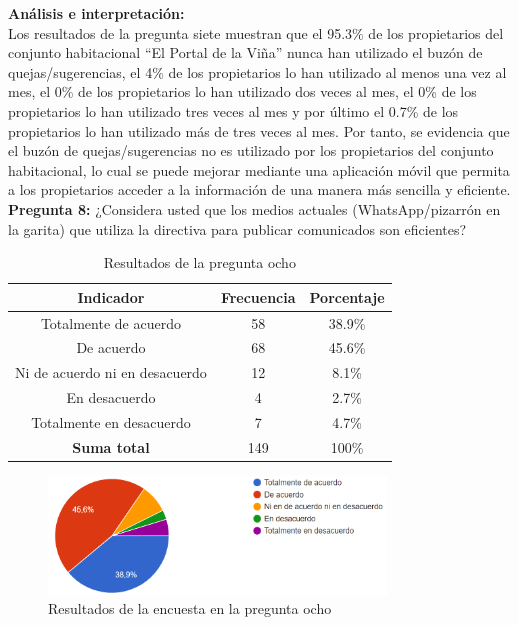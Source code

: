\textbf{Análisis e interpretación:}\\
Los resultados de la pregunta siete muestran que el 95.3\% de los propietarios del conjunto habitacional {\textquotedblleft}El Portal de la Viña{\textquotedblright} nunca han utilizado el buzón de quejas/sugerencias, el 4\% de los propietarios lo han utilizado al menos una vez al mes, el 0\% de los propietarios lo han utilizado dos veces al mes, el 0\% de los propietarios lo han utilizado tres veces al mes y por último el 0.7\% de los propietarios lo han utilizado más de tres veces al mes.
Por tanto, se evidencia que el buzón de quejas/sugerencias no es utilizado por los propietarios del conjunto habitacional, lo cual se puede mejorar mediante una aplicación móvil que permita a los propietarios acceder a la información de una manera más sencilla y eficiente.
\bigbreak
\textbf{Pregunta 8:} ¿Considera usted que los medios actuales (WhatsApp/pizarrón en la garita) que utiliza la directiva para publicar comunicados son eficientes?


    \begin{table}[H]
        \centering
        \caption{Resultados de la pregunta ocho}
        \begin{footnotesize}
        \begin{tabular}{|c|c|c|}
            \hline
            \textbf{Indicador} & \textbf{Frecuencia} &  \textbf{Porcentaje} \\
            \hline
            Totalmente de acuerdo & 58 & 38.9\% \\
            \hline
            De acuerdo & 68 & 45.6\% \\
            \hline
            Ni de acuerdo ni en desacuerdo & 12 & 8.1\% \\
            \hline
            En desacuerdo & 4 & 2.7\% \\
            \hline
            Totalmente en desacuerdo & 7 & 4.7\% \\
            \hline
            \textbf{Suma total} & 149 & 100\% \\
            \hline
        \end{tabular}\label{tab:table_preg_8}
        \end{footnotesize}
    \end{table}

    \begin{figure}[H]
        \centering
        \includegraphics[width=0.8\textwidth]{resources/images/p8}
        \caption{Resultados de la encuesta en la pregunta ocho}\label{fig:figure_p8}
    \end{figure}


